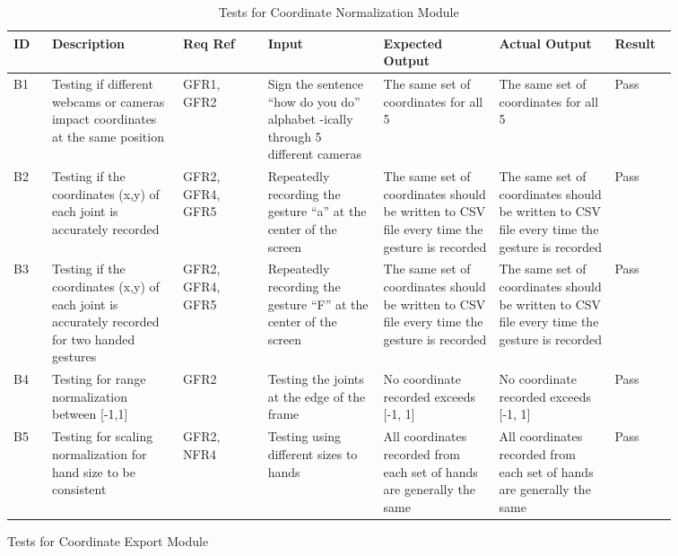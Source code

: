\documentclass[12pt, titlepage]{article}
\begin{document}
\renewcommand{\arraystretch}{1.2}
\noindent \begin{longtable}{p{0.05\linewidth}|p{0.17\linewidth}|p{0.11\linewidth}|p{0.15\linewidth}|p{0.15\linewidth}|p{0.15\linewidth}|p{0.08\linewidth}}
\hline
\textbf{ID} & \textbf{Description} & \textbf{Req Ref} & \textbf{Input} & \textbf{Expected Output} & \textbf{Actual Output} & \textbf{Result}\\
\hline
B1 & Testing if different webcams or cameras impact coordinates at the same position & GFR1, GFR2 & Sign the sentence “how do you do” alphabet -ically through 5 different cameras & The same set of coordinates for all 5 & The same set of coordinates for all 5 & Pass\\ \hline
B2 & Testing if the coordinates (x,y) of each joint is accurately recorded & GFR2, GFR4, GFR5 & Repeatedly recording the gesture “a” at the center of the screen & The same set of coordinates should be written to CSV file every time the gesture is recorded & The same set of coordinates should be written to CSV file every time the gesture is recorded & Pass\\ \hline
B3 & Testing if the coordinates (x,y) of each joint is accurately recorded for two handed gestures & GFR2, GFR4, GFR5 & Repeatedly recording the gesture “F” at the center of the screen & The same set of coordinates should be written to CSV file every time the gesture is recorded & The same set of coordinates should be written to CSV file every time the gesture is recorded & Pass\\ \hline
B4 & Testing for range normalization between [-1,1] & GFR2 & Testing the joints at the edge of the frame & No coordinate recorded exceeds [-1, 1] & No coordinate recorded exceeds [-1, 1] & Pass\\ \hline
B5 & Testing for scaling normalization for hand size to be consistent & GFR2, NFR4 & Testing using different sizes to hands & All coordinates recorded from each set of hands are generally the same & All coordinates recorded from each set of hands are generally the same & Pass
\hline
\caption{Tests for Coordinate Normalization Module}
\end{longtable}

\newpage
\centerline{Tests for Coordinate Export Module}
\end{document}
